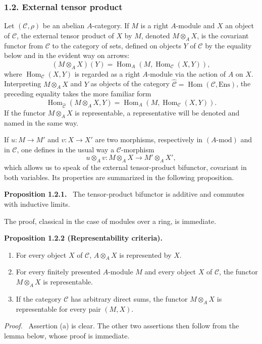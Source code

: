 \documentclass[11pt]{article}
\newenvironment{statement}[1]{\par\medskip\noindent\textbf{#1.}\ }{\par\medskip}
\newenvironment{prooftext}[1][Proof]{\par\noindent\emph{#1.}\ }{\par\medskip}
\DeclareMathOperator{\Hom}{Hom}
\providecommand{\Hom}{\operatorname{Hom}}
\providecommand{\Ens}{\mathrm{Ens}}
\providecommand{\cC}{\mathcal C}
\providecommand{\Ens}{\operatorname{Ens}}
\providecommand{\cC}{\mathcal C}
\providecommand{\Hom}{\operatorname{Hom}}
\begin{document}
\subsubsection*{1.2. External tensor product}
Let $(\cC,\rho)$ be an abelian $A$-category. If $M$ is a right $A$-module and $X$ an object of $\cC$, the external tensor product of $X$ by $M$, denoted $M\otimes_A X$, is the covariant functor from $\cC$ to the category of sets, defined on objects $Y$ of $\cC$ by the equality below and in the evident way on arrows:
\[
(M\otimes_A X)(Y)=\Hom_A(M,\Hom_{\cC}(X,Y)),
\]
where $\Hom_{\cC}(X,Y)$ is regarded as a right $A$-module via the action of $A$ on $X$. Interpreting $M\otimes_AX$ and $Y$ as objects of the category $\widehat{\cC}=\Hom(\cC,\Ens)$, the preceding equality takes the more familiar form
\[
\Hom_{\widehat{\cC}}(M\otimes_A X,Y)=\Hom_A(M,\Hom_{\cC}(X,Y)).
\]
If the functor $M\otimes_A X$ is representable, a representative will be denoted and named in the same way.

If $u:M\to M'$ and $v:X\to X'$ are two morphisms, respectively in $(A\text{-mod})$ and in $\cC$, one defines in the usual way a $\cC$-morphism
\[
u\otimes_A v:M\otimes_A X\longrightarrow M'\otimes_A X',
\]
which allows us to speak of the external tensor-product bifunctor, covariant in both variables. Its properties are summarized in the following proposition.

\begin{statement}{Proposition 1.2.1}
The tensor-product bifunctor is additive and commutes with inductive limits.
\end{statement}
The proof, classical in the case of modules over a ring, is immediate.

\begin{statement}{Proposition 1.2.2 (Representability criteria)}
\begin{enumerate}[label=(\alph*)]
\item For every object $X$ of $\cC$, $A\otimes_AX$ is represented by $X$.
\item For every finitely presented $A$-module $M$ and every object $X$ of $\cC$, the functor $M\otimes_AX$ is representable.
\item If the category $\cC$ has arbitrary direct sums, the functor $M\otimes_A X$ is representable for every pair $(M,X)$.
\end{enumerate}
\end{statement}

\begin{prooftext}[Proof]
Assertion (a) is clear. The other two assertions then follow from the lemma below, whose proof is immediate.
\end{prooftext}
\end{document}
